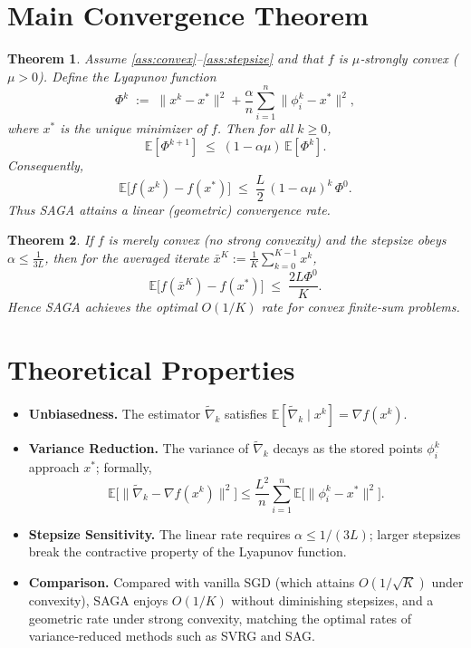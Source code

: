 \documentclass[11pt]{article}
\newtheorem{theorem}{Theorem}
\newcommand{\E}{\mathbb{E}}
\begin{document}
\section*{Main Convergence Theorem}
\begin{theorem}\label{thm:linear}
Assume \ref{ass:convex}–\ref{ass:stepsize} and that $f$ is $\mu$‑strongly convex ($\mu>0$).  
Define the Lyapunov function
\[
\Phi^{k}\;:=\;\|x^{k}-x^{*}\|^{2}+ \frac{\alpha}{n}\sum_{i=1}^{n}\|\phi_i^{k}-x^{*}\|^{2},
\]
where $x^{*}$ is the unique minimizer of $f$.  
Then for all $k\ge0$,
\[
\boxed{\E[\Phi^{k+1}] \;\le\; (1-\alpha\mu)\,\E[\Phi^{k}]}.
\]
Consequently,
\[
\E\bigl[f(x^{k})-f(x^{*})\bigr]\;\le\; \frac{L}{2}\,(1-\alpha\mu)^{k}\,\Phi^{0}.
\]
Thus SAGA attains a linear (geometric) convergence rate.
\end{theorem}
\begin{theorem}\label{thm:convex}
If $f$ is merely convex (no strong convexity) and the stepsize obeys $\alpha\le \frac{1}{3L}$, then for the averaged iterate $\bar x^{K}:=\frac{1}{K}\sum_{k=0}^{K-1}x^{k}$,
\[
\E\bigl[f(\bar x^{K})-f(x^{*})\bigr]\;\le\; \frac{2L\Phi^{0}}{K}.
\]
Hence SAGA achieves the optimal $O(1/K)$ rate for convex finite‑sum problems.
\end{theorem}

\section*{Theoretical Properties}
\begin{itemize}
\item \textbf{Unbiasedness.} The estimator $\tilde{\nabla}_k$ satisfies $\E[\tilde{\nabla}_k\mid x^{k}]=\nabla f(x^{k})$.
\item \textbf{Variance Reduction.} The variance of $\tilde{\nabla}_k$ decays as the stored points $\phi_i^{k}$ approach $x^{*}$; formally,
\[
\E\!\bigl[\|\tilde{\nabla}_k-\nabla f(x^{k})\|^{2}\bigr]\le
\frac{L^{2}}{n}\sum_{i=1}^{n}\E\!\bigl[\|\phi_i^{k}-x^{*}\|^{2}\bigr].
\]
\item \textbf{Stepsize Sensitivity.} The linear rate requires $\alpha\le 1/(3L)$; larger stepsizes break the contractive property of the Lyapunov function.
\item \textbf{Comparison.} Compared with vanilla SGD (which attains $O(1/\sqrt{K})$ under convexity), SAGA enjoys $O(1/K)$ without diminishing stepsizes, and a geometric rate under strong convexity, matching the optimal rates of variance‑reduced methods such as SVRG and SAG.
\end{itemize}
\end{document}
